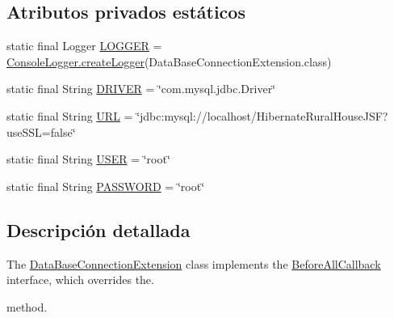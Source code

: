\subsection*{Atributos privados estáticos}
\begin{DoxyCompactItemize}
\item 
static final Logger \mbox{\hyperlink{classcom_1_1ruralhousejsf_1_1extension_1_1_data_base_connection_extension_a936421171342cb936e683bceb8e819e8}{L\+O\+G\+G\+ER}} = \mbox{\hyperlink{classcom_1_1ruralhousejsf_1_1logger_1_1_console_logger_a520321643663e37d95761134a35505cd}{Console\+Logger.\+create\+Logger}}(Data\+Base\+Connection\+Extension.\+class)
\item 
static final String \mbox{\hyperlink{classcom_1_1ruralhousejsf_1_1extension_1_1_data_base_connection_extension_adbba54504b8c15c35363b8c6ee62772f}{D\+R\+I\+V\+ER}} = \char`\"{}com.\+mysql.\+jdbc.\+Driver\char`\"{}
\item 
static final String \mbox{\hyperlink{classcom_1_1ruralhousejsf_1_1extension_1_1_data_base_connection_extension_aec89224948925eb2f40d169ba4dc00a9}{U\+RL}} = \char`\"{}jdbc\+:mysql\+://localhost/Hibernate\+Rural\+House\+J\+SF?use\+S\+SL=false\char`\"{}
\item 
static final String \mbox{\hyperlink{classcom_1_1ruralhousejsf_1_1extension_1_1_data_base_connection_extension_a87696d6ea7d62869301b08d9264182b0}{U\+S\+ER}} = \char`\"{}root\char`\"{}
\item 
static final String \mbox{\hyperlink{classcom_1_1ruralhousejsf_1_1extension_1_1_data_base_connection_extension_a8b37073a138c653895098f4a0c0f661f}{P\+A\+S\+S\+W\+O\+RD}} = \char`\"{}root\char`\"{}
\end{DoxyCompactItemize}


\subsection{Descripción detallada}
The \mbox{\hyperlink{classcom_1_1ruralhousejsf_1_1extension_1_1_data_base_connection_extension}{Data\+Base\+Connection\+Extension}} class implements the \mbox{\hyperlink{}{Before\+All\+Callback}} interface, which overrides the. 


\begin{DoxyCode}{0}
\end{DoxyCode}


method. 

